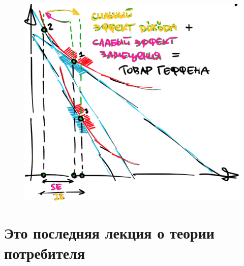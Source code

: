 \documentclass{beamer}
\begin{document}
\begin{frame}
\begin{figure}[hbt]
\centering
\includegraphics[width=.8 \textwidth]{IESE_CV.png}
\end{figure}

\end{frame}

\section{Это последняя лекция о теории потребителя}
\end{document}

